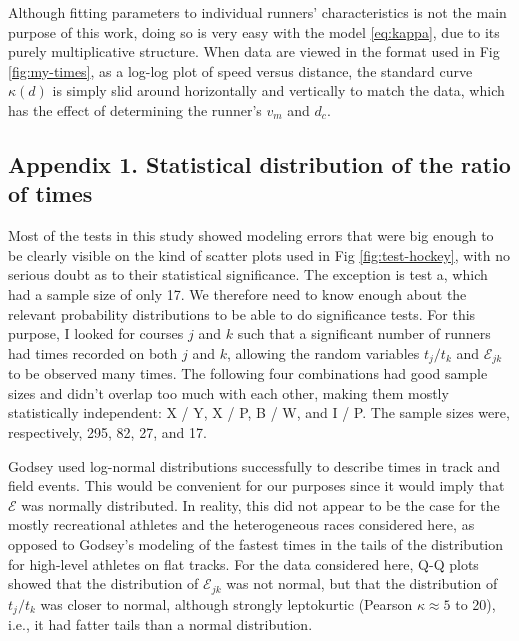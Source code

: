 \documentclass[10pt,letterpaper]{article}
\begin{document}


Although fitting parameters to individual runners' characteristics is not the main purpose of this work, doing
so is very easy with the model \ref{eq:kappa}, due to its purely multiplicative structure.
When data are viewed in the format used in Fig \ref{fig:my-times}, as a log-log plot of speed versus distance,
the standard curve $\kappa(d)$ is simply slid around horizontally and vertically to match the data, which
has the effect of determining the runner's $v_m$ and $d_c$.

\subsection*{Appendix 1. Statistical distribution of the ratio of times}

Most of the tests in this study showed modeling errors that were big enough to be clearly
visible on the kind of scatter plots used in Fig \ref{fig:test-hockey}, with no serious doubt
as to their statistical significance. The exception is test a, which had a sample size of
only 17. We therefore need to know enough about the relevant probability distributions to
be able to do significance tests. For this purpose, I looked for courses $j$ and $k$ such
that a significant number of runners had times recorded on both $j$ and $k$, allowing
the random variables $t_j/t_k$ and $\mathcal{E}_{jk}$ to be observed many times. The following four
combinations had good sample sizes and didn't overlap too much with each other, making them
mostly statistically independent: X / Y, X / P, B / W, and I / P. The sample sizes were,
respectively, 295, 82, 27, and 17.

Godsey\cite{godsey} used log-normal distributions successfully to describe times in track and
field events. This would be convenient for our purposes since it would imply that $\mathcal{E}$
was normally distributed. In reality, this did not appear to be the case for the mostly recreational
athletes and the heterogeneous races considered here, as opposed to Godsey's modeling of
the fastest times in the tails of the distribution for high-level athletes on flat tracks. For the data considered here,
Q-Q plots showed that the distribution of $\mathcal{E}_{jk}$ was not normal, but that
the distribution of $t_j/t_k$ was closer to normal, although strongly leptokurtic
(Pearson $\kappa\approx 5$ to 20), i.e., it had fatter tails than a normal distribution.
\end{document}
